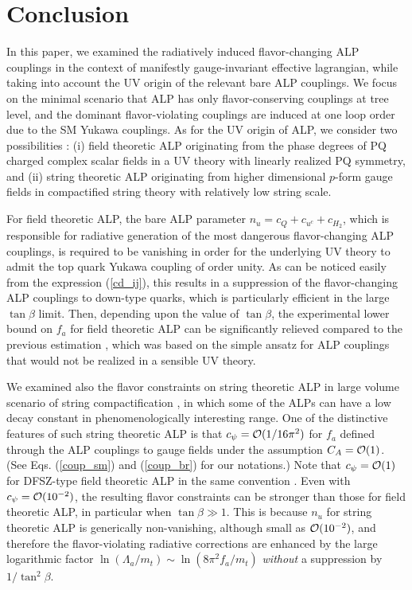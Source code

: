 \documentclass[preprint,prd,aps,tighten,nofootinbib,amssymb]{revtex4}
\def\vpq{f_{a}}
\begin{document}
\section{Conclusion} \label{sec:conc}

In this paper, we examined  the radiatively induced flavor-changing  ALP couplings in the context of manifestly gauge-invariant  effective lagrangian, while taking into account the UV origin of the relevant bare ALP couplings. We focus on the minimal   scenario that ALP has only flavor-conserving couplings at tree level, and the dominant flavor-violating couplings are induced at one loop order due to the SM Yukawa couplings. 
As for the UV origin of ALP, we consider two possibilities : (i) field theoretic ALP originating from the phase degrees of PQ charged complex scalar fields in a UV theory with linearly realized PQ symmetry, and (ii) string theoretic ALP originating from higher dimensional $p$-form gauge fields in compactified string theory with relatively low  string scale.

For field theoretic ALP, the bare ALP parameter
 $n_u=c_Q+c_{u^c}+c_{H_2}$, which is responsible for radiative generation of the most dangerous flavor-changing ALP couplings,  is required to be vanishing in order for the underlying UV theory to admit the top quark Yukawa coupling of order unity. As can be noticed easily from the expression (\ref{cd_ij}),  this results in a 
suppression of the flavor-changing ALP couplings to down-type quarks, which is particularly efficient in the large $\tan\beta$ limit. Then, depending upon the value of $\tan\beta$, the experimental lower bound on $\vpq$ for field theoretic ALP  can be significantly  relieved  compared to the 
previous estimation  \cite{Batell:2009jf, Dolan:2014ska}, which was  based on the simple ansatz for ALP couplings that would not be realized in a sensible UV theory.

We examined also the flavor constraints on string theoretic  ALP in large volume scenario of string compactification  \cite{Balasubramanian:2005zx}, in which some of the ALPs can have a low decay constant in phenomenologically interesting range. One of the distinctive features of such string theoretic ALP is that $c_\psi ={\cal O}(1/16\pi^2)$ for  $f_a$  defined through the ALP couplings to gauge fields under the assumption  $C_A={\cal O}(1)$.
(See Eqs. (\ref{coup_sm}) and (\ref{coup_br}) for our notations.)
Note that $c_\psi={\cal O}(1)$ for DFSZ-type field theoretic ALP in the same convention \cite{Kim:2008hd}.  
Even with  $c_\psi={\cal O}(10^{-2})$, the resulting flavor constraints can be stronger than those for field theoretic ALP, in particular when $\tan\beta\gg 1$. This is
because  $n_u$ for string theoretic ALP is generically non-vanishing, although small as ${\cal O}(10^{-2})$, and therefore the flavor-violating radiative
corrections are enhanced by the large logarithmic factor $\ln(\Lambda_a/m_t)\sim \ln(8\pi^2 f_a/m_t)$ {\it without} a suppression by $1/\tan^2\beta$.
\end{document}
